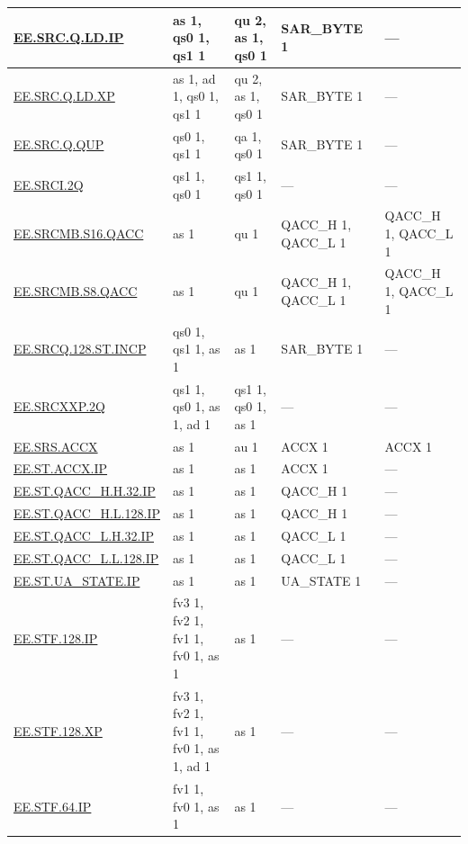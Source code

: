 \begin{longtable}[c]{|l|m{2.5cm}|m{2.5cm}|m{2.5cm}|m{2.5cm}|}
    \hyperref[instruction:EESRCQLDIP]{EE.SRC.Q.LD.IP} & as 1, qs0 1, qs1 1 & qu 2, as 1, qs0 1 & SAR\_BYTE 1 & — \\\hline
    \hyperref[instruction:EESRCQLDXP]{EE.SRC.Q.LD.XP} & as 1, ad 1, qs0 1, qs1 1 & qu 2, as 1, qs0 1 & SAR\_BYTE 1 & — \\\hline
    \hyperref[instruction:EESRCQQUP]{EE.SRC.Q.QUP} & qs0 1, qs1 1 & qa 1, qs0 1 & SAR\_BYTE 1 & — \\\hline
    \hyperref[instruction:EESRCI2Q]{EE.SRCI.2Q} & qs1 1, qs0 1 & qs1 1, qs0 1 & — & — \\\hline
    \hyperref[instruction:EESRCMBS16QACC]{EE.SRCMB.S16.QACC} & as 1 & qu 1 & QACC\_H 1, QACC\_L 1 & QACC\_H 1, QACC\_L 1\\\hline
    \hyperref[instruction:EESRCMBS8QACC]{EE.SRCMB.S8.QACC} & as 1 & qu 1 & QACC\_H 1, QACC\_L 1 & QACC\_H 1, QACC\_L 1\\\hline
    \hyperref[instruction:EESRCQ128STINCP]{EE.SRCQ.128.ST.INCP} & qs0 1, qs1 1, as 1 & as 1 & SAR\_BYTE 1 & — \\\hline
    \hyperref[instruction:EESRCXXP2Q]{EE.SRCXXP.2Q} & qs1 1, qs0 1, as 1, ad 1 & qs1 1, qs0 1, as 1 & — & — \\\hline
    \hyperref[instruction:EESRSACCX]{EE.SRS.ACCX} & as 1 & au 1 & ACCX 1 & ACCX 1\\\hline
    \hyperref[instruction:EESTACCXIP]{EE.ST.ACCX.IP} & as 1 & as 1 & ACCX 1 & — \\\hline
    \hyperref[instruction:EESTQACCHH32IP]{EE.ST.QACC\_H.H.32.IP} & as 1 & as 1 & QACC\_H 1 & — \\\hline
    \hyperref[instruction:EESTQACCHL128IP]{EE.ST.QACC\_H.L.128.IP} & as 1 & as 1 & QACC\_H 1 & — \\\hline
    \hyperref[instruction:EESTQACCLH32IP]{EE.ST.QACC\_L.H.32.IP} & as 1 & as 1 & QACC\_L 1 & — \\\hline
    \hyperref[instruction:EESTQACCLL128IP]{EE.ST.QACC\_L.L.128.IP} & as 1 & as 1 & QACC\_L 1 & — \\\hline
    \hyperref[instruction:EESTUASTATEIP]{EE.ST.UA\_STATE.IP} & as 1 & as 1 & UA\_STATE 1 & — \\\hline
    \hyperref[instruction:EESTF128IP]{EE.STF.128.IP} & fv3 1, fv2 1, fv1 1, fv0 1, as 1 & as 1 & — & — \\\hline
    \hyperref[instruction:EESTF128XP]{EE.STF.128.XP} & fv3 1, fv2 1, fv1 1, fv0 1, as 1, ad 1 & as 1 & — & — \\\hline
    \hyperref[instruction:EESTF64IP]{EE.STF.64.IP} & fv1 1, fv0 1, as 1 & as 1 & — & — \\\hline

\end{longtable}
